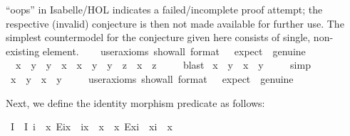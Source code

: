 \begin{isabellebody}
{{  ``oops'' in Isabelle/HOL indicates a failed/incomplete proof attempt; the respective (invalid) conjecture is 
  then not made available for further use. The simplest countermodel for the conjecture given
  here consists of single, non-existing element. }%
}
\isanewline
\ \ \isamarkupfalse%
\ {\isacharbrackleft}user{\isacharunderscore}axioms{\isacharcomma}\ show{\isacharunderscore}all{\isacharcomma}\ format\ {\isacharequal}\ {}{\isacharcomma}\ expect\ {\isacharequal}\ genuine{\isacharbrackright}%
\isadelimproof
\ %
\endisadelimproof
%
\isatagproof
{}\isamarkupfalse%
%
\endisatagproof
{\isafoldproof}%
%
\isadelimproof
%
\endisadelimproof
\ \ \isanewline
{}\isamarkupfalse%
\ {\isachardoublequoteopen}\ {\isacharparenleft}x\ {\isasymsimeq}\ y\ \isactrlbold {\isasymrightarrow}\ y\ {\isasymsimeq}\ x{\isacharparenright}\ \isactrlbold {\isasymand}\ {\isacharparenleft}{\isacharparenleft}x\ {\isasymsimeq}\ y\ \isactrlbold {\isasymand}\ y\ {\isasymsimeq}\ z{\isacharparenright}\ \isactrlbold {\isasymrightarrow}\ x\ {\isasymsimeq}\ z{\isacharparenright}{\isachardoublequoteclose}\ \isanewline
%
\isadelimproof
\ \ %
\endisadelimproof
%
\isatagproof
{}\isamarkupfalse%
\ blast%
\endisatagproof
{\isafoldproof}%
%
\isadelimproof
\isanewline
%
\endisadelimproof
{}\isamarkupfalse%
\ {\isachardoublequoteopen}x\ {\isasymsimeq}\ y\ \isactrlbold {\isasymrightarrow}\ x\ {\isasymcong}\ y{\isachardoublequoteclose}\ \isanewline
%
\isadelimproof
\ \ %
\endisadelimproof
%
\isatagproof
{}\isamarkupfalse%
\ simp%
\endisatagproof
{\isafoldproof}%
%
\isadelimproof
\isanewline
%
\endisadelimproof
{}\isamarkupfalse%
\ {\isachardoublequoteopen}x\ {\isasymsimeq}\ y\ \isactrlbold {\isasymleftarrow}\ x\ {\isasymcong}\ y{\isachardoublequoteclose}\ %
\isanewline
\ \ \isamarkupfalse%
\ {\isacharbrackleft}user{\isacharunderscore}axioms{\isacharcomma}\ show{\isacharunderscore}all{\isacharcomma}\ format\ {\isacharequal}\ {}{\isacharcomma}\ expect\ {\isacharequal}\ genuine{\isacharbrackright}%
\isadelimproof
\ %
\endisadelimproof
%
\isatagproof
{}\isamarkupfalse%
%
\endisatagproof
{\isafoldproof}%
%
\isadelimproof
%
\endisadelimproof
%
\begin{isamarkuptext}%
Next, we define the identity morphism predicate  as follows:%
\end{isamarkuptext}\isamarkuptrue%
\isamarkupfalse%
\ I\ \ {\isachardoublequoteopen}I\ i\ {\isasymequiv}\ {\isacharparenleft}\isactrlbold {\isasymforall}x{\isachardot}\ E{\isacharparenleft}i{\isasymcdot}x{\isacharparenright}\ \isactrlbold {\isasymrightarrow}\ i{\isasymcdot}x\ {\isasymcong}\ x{\isacharparenright}\ \isactrlbold {\isasymand}\ {\isacharparenleft}\isactrlbold {\isasymforall}x{\isachardot}\ E{\isacharparenleft}x{\isasymcdot}i{\isacharparenright}\ \isactrlbold {\isasymrightarrow}\ x{\isasymcdot}i\ {\isasymcong}\ x{\isacharparenright}{\isachardoublequoteclose}%

\end{isabellebody}
